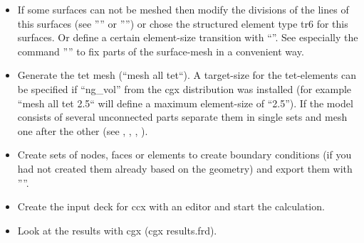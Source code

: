 \documentclass{article}
\begin{document}
\begin{appendix}
\begin{itemize}
\item If some surfaces can not be meshed then modify the divisions of the lines of this surfaces (see '''' or '''') or chose the structured element type tr6 for this surfaces. Or define a certain element-size transition with ``''. See especially the command '''' to fix parts of the surface-mesh in a convenient way.

\item Generate the tet mesh (``mesh all tet``). A target-size for the tet-elements can be specified if ``ng\_vol'' from the cgx distribution was installed (for example ``mesh all tet 2.5`` will define a maximum element-size of ``2.5''). If the model consists of several unconnected parts separate them in single sets and mesh one after the other (see , , , ).

\item Create sets of nodes, faces or elements to create boundary conditions (if you had not created them already based on the geometry) and export them with ''''.

\item Create the input deck for ccx with an editor and start the calculation.

\item Look at the results with cgx (cgx results.frd).
\end{itemize}



\end{appendix}
\end{document}
